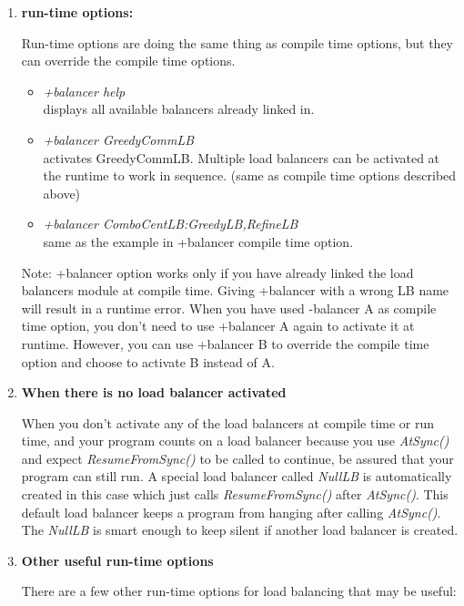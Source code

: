 \begin{enumerate}
\item {\bf run-time options:}

Run-time options are doing the same thing as compile time options, but they can override the compile time options.

\begin{itemize}
\item {\em +balancer help} \\
  displays all available balancers already linked in.
\item {\em +balancer GreedyCommLB} \\
  activates GreedyCommLB. Multiple load balancers can be activated at the runtime to work in sequence. (same as compile time options described above)
\item {\em +balancer ComboCentLB:GreedyLB,RefineLB}  \\
  same as the example in +balancer compile time option.
\end{itemize}

Note: +balancer option works only if you have already linked the load balancers module at compile time. 
Giving +balancer with a wrong LB name will result in a runtime error.
When you have used -balancer A as compile time option, you don't need to use 
+balancer A again to activate it at runtime. However, you can 
use +balancer B to override the compile time option and choose to
activate B instead of A.

\item {\bf When there is no load balancer activated}

When you don't activate any of the load balancers at compile time or run time, 
and your program counts on a load balancer because you use {\em AtSync()}
and expect {\em ResumeFromSync()} to be called to continue,
be assured that your program can still run. 
A special load balancer called {\em NullLB} is 
automatically created in this case which just
calls {\em ResumeFromSync()} after {\em AtSync()}. 
This default load balancer keeps a program from hanging after calling {\em AtSync()}.
The {\em NullLB} is smart enough to keep silent if another 
load balancer is created.

\item {\bf Other useful run-time options}

There are a few other run-time options for load balancing that may be useful:


\end{enumerate}
